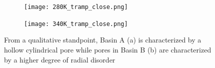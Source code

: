 \documentclass{article}
\begin{document}
  \begin{figure}[!ht]
        \centering
        \begin{subfigure}[b]{0.475\textwidth}
                \centering
                \texttt{[image: 280K\_tramp\_close.png]}
                \caption{}\label{fig:abasin}
        \end{subfigure}
        \begin{subfigure}[b]{0.475\textwidth}
                \centering
                \texttt{[image: 340K\_tramp\_close.png]}
                \caption{}\label{fig:bbasin}
        \end{subfigure}
	\caption{From a qualitative standpoint, Basin A (a) is characterized by a
	hollow cylindrical pore while pores in Basin B (b) are characterized by a
	higher degree of radial disorder}\label{fig:basins}
  \end{figure}

\end{document}
